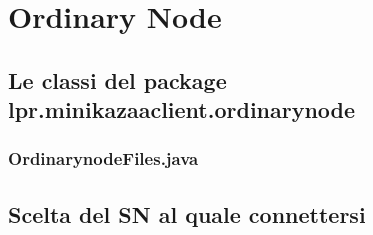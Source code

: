 \chapter{Ordinary Node}
\section{Le classi del package lpr.minikazaaclient.ordinarynode}
\subsection{OrdinarynodeFiles.java}\label{sec:on_files}

\section{Scelta del SN al quale connettersi}\label{sec:scelta_sn}
